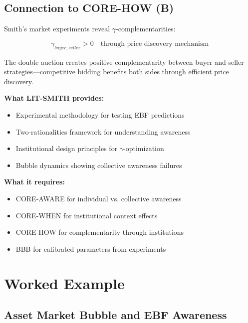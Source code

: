 \subsection{Connection to CORE-HOW (B)}

Smith's market experiments reveal $\gamma$-complementarities:

\begin{equation}
\gamma_{buyer,seller} > 0 \quad \text{through price discovery mechanism}
\label{eq:vs-gamma}
\end{equation}

The double auction creates positive complementarity between buyer and seller
strategies---competitive bidding benefits both sides through efficient price
discovery.

\begin{tcolorbox}[colback=yellow!5!white, colframe=yellow!75!black,
    title=Integration: LIT-SMITH $\leftrightarrow$ EBF CORE]
\textbf{What LIT-SMITH provides:}
\begin{itemize}[nosep]
\item Experimental methodology for testing EBF predictions
\item Two-rationalities framework for understanding awareness
\item Institutional design principles for $\gamma$-optimization
\item Bubble dynamics showing collective awareness failures
\end{itemize}

\textbf{What it requires:}
\begin{itemize}[nosep]
\item CORE-AWARE for individual vs. collective awareness
\item CORE-WHEN for institutional context effects
\item CORE-HOW for complementarity through institutions
\item BBB for calibrated parameters from experiments
\end{itemize}
\end{tcolorbox}


\section{Worked Example}
\label{sec:vs-example}

\subsection{Asset Market Bubble and EBF Awareness}

